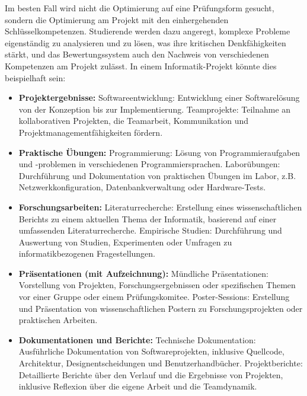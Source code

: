 \documentclass[conference]{IEEEtran}
\begin{document}
Im besten Fall wird nicht die Optimierung auf eine Prüfungsform gesucht, sondern die Optimierung am Projekt mit den einhergehenden Schlüsselkompetenzen. Studierende werden dazu angeregt, komplexe Probleme eigenständig zu analysieren und zu lösen, was ihre kritischen Denkfähigkeiten stärkt, und das Bewertungssystem auch den Nachweis von verschiedenen Kompetenzen am Projekt zulässt. In einem Informatik-Projekt könnte dies beispielhaft sein:

\begin{itemize}[leftmargin=*]
    \item \textbf{Projektergebnisse:}
    \newline Softwareentwicklung: Entwicklung einer Softwarelösung von der Konzeption bis zur Implementierung.
    \newline Teamprojekte: Teilnahme an kollaborativen Projekten, die Teamarbeit, Kommunikation und Projektmanagementfähigkeiten fördern.

    \item \textbf{Praktische Übungen:}
    \newline Programmierung: Lösung von Programmieraufgaben und -problemen in verschiedenen Programmiersprachen.
    \newline Laborübungen: Durchführung und Dokumentation von praktischen Übungen im Labor, z.B. Netzwerkkonfiguration, Datenbankverwaltung oder Hardware-Tests.

    \item \textbf{Forschungsarbeiten:}
    \newline Literaturrecherche: Erstellung eines wissenschaftlichen Berichts zu einem aktuellen Thema der Informatik, basierend auf einer umfassenden Literaturrecherche.
    \newline Empirische Studien: Durchführung und Auswertung von Studien, Experimenten oder Umfragen zu informatikbezogenen Fragestellungen.

    \item \textbf{Präsentationen (mit Aufzeichnung):}
    \newline Mündliche Präsentationen: Vorstellung von Projekten, Forschungsergebnissen oder spezifischen Themen vor einer Gruppe oder einem Prüfungskomitee.
    \newline Poster-Sessions: Erstellung und Präsentation von wissenschaftlichen Postern zu Forschungsprojekten oder praktischen Arbeiten.

    \item \textbf{Dokumentationen und Berichte:}
    \newline Technische Dokumentation: Ausführliche Dokumentation von Softwareprojekten, inklusive Quellcode, Architektur, Designentscheidungen und Benutzerhandbücher.
    \newline Projektberichte: Detaillierte Berichte über den Verlauf und die Ergebnisse von Projekten, inklusive Reflexion über die eigene Arbeit und die Teamdynamik.


\end{itemize}
\end{document}
